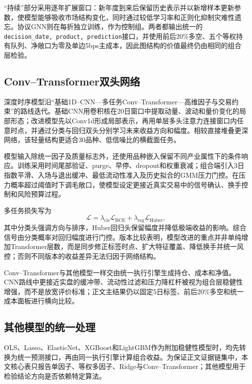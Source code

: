 \documentclass[UTF8,zihao=-4,fontset=ubuntu]{ctexart}
\newcommand{\code}[1]{\texttt{#1}}
\begin{document}
“持续”部分采用逐年扩展窗口：新年度到来后保留历史表示并以新增样本更新参数，使模型能够吸收市场结构变化，同时通过较低学习率和正则化抑制灾难性遗忘。协议GNN则在每折独立训练，作为控制组。两者都输出统一的\code{decision\_date, product, prediction}接口，并使用前后20\%多空、五个等权持有队列、净敞口为零及单边5bps主成本，因此图结构的价值最终仍由相同的组合层检验。

\subsection{Conv--Transformer双头网络}

深度时序模型沿“基础1D--CNN—多任务Conv--Transformer—高维因子与交易约束”的路线迭代。基础CNN用卷积核在20日窗口中提取动量、波动和量价变化的局部形态；改进模型先以Conv1d形成局部表示，再用单层多头注意力连接窗口内任意时点，并通过分类与回归双头分别学习未来收益方向和幅度。相较直接堆叠更深网络，该轻量结构更适合30品种、低信噪比的横截面任务。

模型输入除统一因子及质量标志外，还使用品种嵌入保留不同产业属性下的条件响应。训练采用时间尾部验证、purge、早停、dropout和权重衰减；组合端引入3日指数平滑、入场与退出缓冲、最低流动性准入及历史拟合的GMM压力门控。在压力概率超过阈值时下调毛敞口，使模型设定更接近真实交易中的信号确认、换手控制和风险预算过程。

多任务损失写为
\begin{equation}
\mathcal L=\lambda_{\mathrm{cls}}\mathcal L_{\mathrm{BCE}}+\lambda_{\mathrm{reg}}\mathcal L_{\mathrm{Huber}},
\end{equation}
其中分类头强调方向与排序，Huber回归头保留幅度并降低极端收益的影响。综合信号由分类概率对回归幅度进行门控。版本比较表明，模型改进的重点并非单纯增加Transformer层数，而是同步修正标签时点、扩大特征覆盖、降低换手并统一风控；否则不同版本的收益差异无法归因于网络结构。

Conv--Transformer与其他模型一样交由统一执行引擎生成持仓、成本和净值。CNN路线中更接近实盘的缓冲带、流动性过滤和压力降杠杆被视为组合层稳健性增强，而不是放宽评价标准；正文主结果仍以固定5日标签、前后20\%多空和统一成本面板进行横向比较。

\subsection{其他模型的统一处理}

OLS、Lasso、ElasticNet、XGBoost和LightGBM作为附加稳健性模型时，均先转换为统一预测接口，再由同一执行引擎计算组合收益。为保证正文证据链集中，本文核心表只报告单因子、等权多因子、Ridge与Conv--Transformer；其他模型用于检验结论方向是否依赖特定算法。
\end{document}
